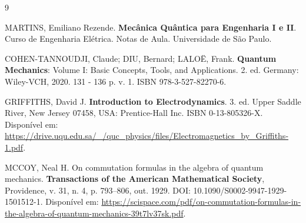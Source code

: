 \begin{thebibliography}{9}

MARTINS, Emiliano Rezende. \textbf{Mecânica Quântica para Engenharia I e II}. Curso de Engenharia Elétrica. Notas de Aula. Universidade de São Paulo.

COHEN-TANNOUDJI, Claude; DIU, Bernard; LALOË, Frank. \textbf{Quantum Mechanics}: Volume I: Basic Concepts, Tools, and Applications. 2. ed. Germany: Wiley-VCH, 2020. 131 - 136 p. v. 1. ISBN 978-3-527-82270-6.

GRIFFITHS, David J. \textbf{Introduction to Electrodynamics}. 3. ed. Upper Saddle River, New Jersey 07458, USA: Prentice-Hall Inc. ISBN 0-13-805326-X. Disponível em: \url{https://drive.uqu.edu.sa/_/quc_physics/files/Electromagnetics_by_Griffiths-1.pdf}.

MCCOY, Neal H. On commutation formulas in the algebra of quantum mechanics. \textbf{Transactions of the American Mathematical Society}, Providence, v. 31, n. 4, p. 793--806, out. 1929. DOI: 10.1090/S0002-9947-1929-1501512-1. Disponível em: \url{https://scispace.com/pdf/on-commutation-formulas-in-the-algebra-of-quantum-mechanics-39t7lv37sk.pdf}.

\end{thebibliography}


